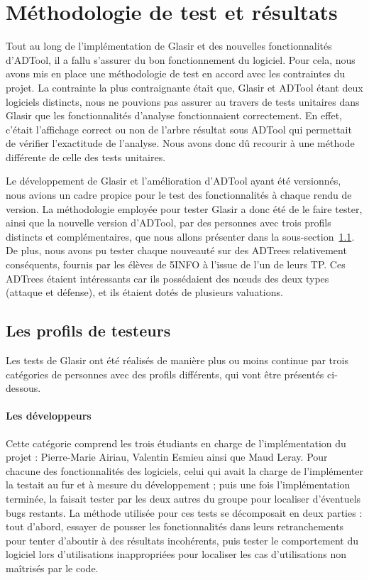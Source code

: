 \section{Méthodologie de test et résultats}
\label{sec:cr_tests}

Tout au long de l'implémentation de Glasir et des nouvelles fonctionnalités d'ADTool, il a fallu s'assurer du bon fonctionnement du logiciel. Pour cela, nous avons mis en place une méthodologie de test en accord avec les contraintes du projet. La contrainte la plus contraignante était que, Glasir et ADTool étant deux logiciels distincts, nous ne pouvions pas assurer au travers de tests unitaires dans Glasir que les fonctionnalités d'analyse fonctionnaient correctement. En effet, c'était l'affichage correct ou non de l'arbre résultat sous ADTool qui permettait de vérifier l'exactitude de l'analyse. Nous avons donc dû recourir à une méthode différente de celle des tests unitaires.

Le développement de Glasir et l'amélioration d'ADTool ayant été versionnés, nous avions un cadre propice pour le test des fonctionnalités à chaque rendu de version. La méthodologie employée pour tester Glasir a donc été de le faire tester, ainsi que la nouvelle version d'ADTool, par des personnes avec trois profils distincts et complémentaires, que nous allons présenter dans la {\sc sous-section}~\ref{subsec:testeurs}. De plus, nous avons pu tester chaque nouveauté sur des ADTrees relativement conséquents, fournis par les élèves de 5INFO à l'issue de l'un de leurs TP. Ces ADTrees étaient intéressants car ils possédaient des n\oe{}uds des deux types (attaque et défense), et ils étaient dotés de plusieurs valuations.

\subsection{Les profils de testeurs}
\label{subsec:testeurs}

Les tests de Glasir ont été réalisés de manière plus ou moins continue par trois catégories de personnes avec des profils différents, qui vont être présentés ci-dessous.

\paragraph{Les développeurs} Cette catégorie comprend les trois étudiants en charge de l'implémentation du projet : Pierre-Marie {\sc Airiau}, Valentin {\sc Esmieu} ainsi que Maud {\sc Leray}. Pour chacune des fonctionnalités des logiciels, celui qui avait la charge de l'implémenter la testait au fur et à mesure du développement ; puis une fois l'implémentation terminée, la faisait tester par les deux autres du groupe pour localiser d'éventuels \og bugs \fg{} restants. La méthode utilisée pour ces tests se décomposait en deux parties : tout d'abord, essayer de pousser les fonctionnalités dans leurs retranchements pour tenter d'aboutir à des résultats incohérents, puis tester le comportement du logiciel lors d'utilisations inappropriées pour localiser les cas d'utilisations non maîtrisés par le code.

